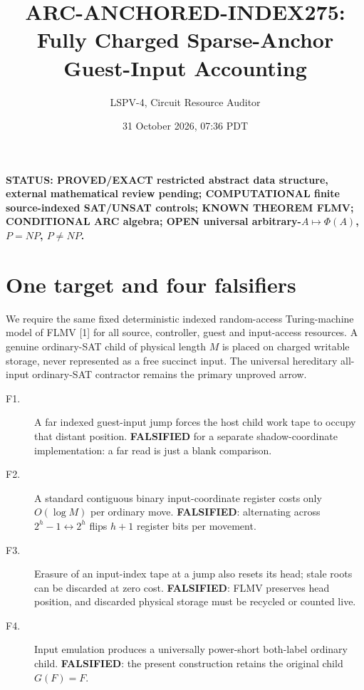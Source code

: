 \documentclass[11pt]{article}
\title{ARC-ANCHORED-INDEX275: Fully Charged Sparse-Anchor Guest-Input Accounting}
\author{LSPV-4, Circuit Resource Auditor}
\date{31 October 2026, 07:36 PDT}
\begin{document}
\sloppy\setlength{\emergencystretch}{4em}\maketitle
\noindent\textbf{STATUS: PROVED/EXACT restricted abstract data structure, external mathematical review pending; COMPUTATIONAL finite source-indexed SAT/UNSAT controls; KNOWN THEOREM FLMV; CONDITIONAL ARC algebra; OPEN universal arbitrary-$A\mapsto\Phi(A)$, $P=NP$, $P\ne NP$.}
\section*{One target and four falsifiers}
We require the same fixed deterministic indexed random-access Turing-machine model of FLMV [1] for all source, controller, guest and input-access resources. A genuine ordinary-SAT child of physical length $M$ is placed on charged writable storage, never represented as a free succinct input. The universal hereditary all-input ordinary-SAT contractor remains the primary unproved arrow.
\begin{description}
\item[F1.] A far indexed guest-input jump forces the host child work tape to occupy that distant position. \textbf{FALSIFIED} for a separate shadow-coordinate implementation: a far read is just a blank comparison.
\item[F2.] A standard contiguous binary input-coordinate register costs only $O(\log M)$ per ordinary move. \textbf{FALSIFIED}: alternating across $2^h-1\leftrightarrow 2^h$ flips $h+1$ register bits per movement.
\item[F3.] Erasure of an input-index tape at a jump also resets its head; stale roots can be discarded at zero cost. \textbf{FALSIFIED}: FLMV preserves head position, and discarded physical storage must be recycled or counted live.
\item[F4.] Input emulation produces a universally power-short both-label ordinary child. \textbf{FALSIFIED}: the present construction retains the original child $G(F)=F$.
\end{description}
\end{document}
